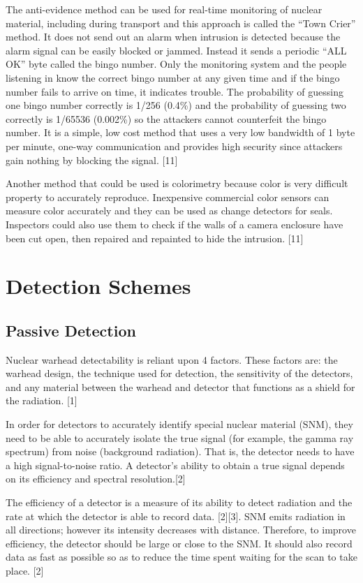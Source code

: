 \documentclass[twocolumn,a4paper]{article}
\begin{document}
The anti-evidence method can be used for real-time monitoring of nuclear material, including during 
transport and this approach is called the ``Town Crier'' method. It does not send out an alarm when 
intrusion is detected because the alarm signal can be easily blocked or jammed. Instead it sends a 
periodic ``ALL OK'' byte called the bingo number. Only the monitoring system and the people listening 
in know the correct bingo number at any given time and if the bingo number fails to arrive on time, 
it indicates trouble. The probability of guessing one bingo number correctly is 1/256 (0.4\%) and the 
probability of guessing two correctly is 1/65536 (0.002\%) so the attackers cannot counterfeit the bingo 
number. It is a simple, low cost method that uses a very low bandwidth of 1 byte per minute, one-way 
communication and provides high security since attackers gain nothing by blocking the signal. [11]

Another method that could be used is colorimetry because color is very difficult property to accurately 
reproduce. Inexpensive commercial color sensors can measure color accurately and they can be used as change 
detectors for seals. Inspectors could also use them to check if the walls of a camera enclosure have been 
cut open, then repaired and repainted to hide the intrusion. [11]

\section{Detection Schemes}
\subsection{Passive Detection}

Nuclear warhead detectability is reliant upon 4 factors. These factors are: the warhead
design, the technique used for detection, the sensitivity of the detectors, and any material
between the warhead and detector that functions as a shield for the radiation. [1]

In order for detectors to accurately identify special nuclear material (SNM), they need to
be able to accurately isolate the true signal (for example, the gamma ray spectrum) from noise
(background radiation). That is, the detector needs to have a high signal-to-noise ratio. A
detector’s ability to obtain a true signal depends on its efficiency and spectral resolution.[2]

The efficiency of a detector is a measure of its ability to detect radiation and the rate at
which the detector is able to record data. [2][3]. SNM emits radiation in all directions; however
its intensity decreases with distance. Therefore, to improve efficiency, the detector should be
large or close to the SNM. It should also record data as fast as possible so as to reduce the time
spent waiting for the scan to take place. [2]
\end{document}
